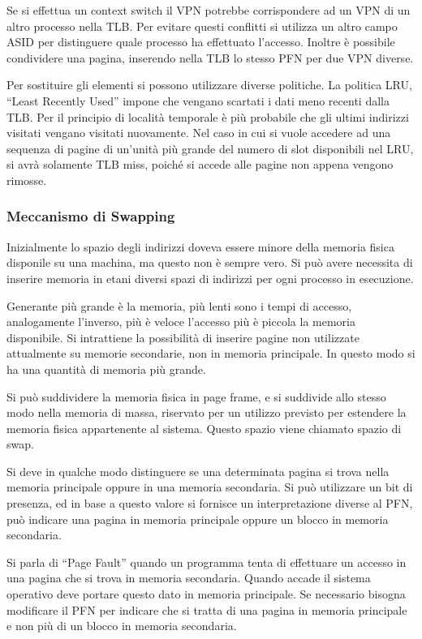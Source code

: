 \documentclass{article}
\numberwithin{equation}{subsection}
\begin{document}
Se si effettua un context switch il VPN potrebbe corrispondere ad un VPN di un altro processo nella TLB. Per evitare questi conflitti si utilizza un altro campo 
ASID per distinguere quale processo ha effettuato l'accesso. Inoltre è possibile condividere una pagina, inserendo nella TLB lo stesso PFN per due VPN diverse. 

Per sostituire gli elementi si possono utilizzare diverse politiche. La politica LRU, ``Least Recently Used'' impone che vengano scartati i dati meno recenti dalla 
TLB. Per il principio di località temporale è più probabile che gli ultimi indirizzi visitati vengano visitati nuovamente. Nel caso in cui si vuole accedere ad una 
sequenza di pagine di un'unità più grande del numero di slot disponibili nel LRU, si avrà solamente TLB miss, poiché si accede alle pagine non appena vengono rimosse. 

\subsubsection{Meccanismo di Swapping}

Inizialmente lo spazio degli indirizzi doveva essere minore della memoria fisica disponile su una machina, ma questo non è sempre vero. Si può avere necessita di 
inserire memoria in etani diversi spazi di indirizzi per ogni processo in esecuzione. 


Generante più grande è la memoria, più lenti sono i tempi di accesso, analogamente l'inverso, più è veloce l'accesso più è piccola la memoria disponibile. Si intrattiene 
la possibilità di inserire pagine non utilizzate attualmente su memorie secondarie, non in memoria principale. In questo modo si ha una quantità di memoria più grande. 

Si può suddividere la memoria fisica in page frame, e si suddivide allo stesso modo nella memoria di massa, riservato per un utilizzo previsto per estendere la memoria 
fisica appartenente al sistema. Questo spazio viene chiamato spazio di swap. 


Si deve in qualche modo distinguere se una determinata pagina si trova nella memoria principale oppure in una memoria secondaria. Si può utilizzare un bit di 
presenza, ed in base a questo valore si fornisce un interpretazione diverse al PFN, può indicare una pagina in memoria principale oppure un blocco in memoria secondaria. 

Si parla di ``Page Fault'' quando un programma tenta di effettuare un accesso in una pagina che si trova in memoria secondaria. Quando accade il sistema operativo 
deve portare questo dato in memoria principale. Se necessario bisogna modificare il PFN per indicare che si tratta di una pagina in memoria principale e non più di un blocco 
in memoria secondaria. 
\end{document}
